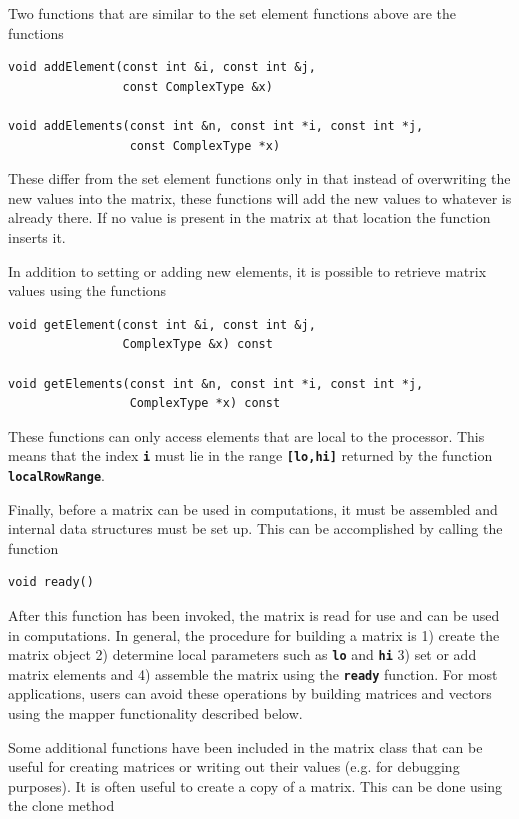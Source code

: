 \documentclass[12pt]{report} %
\begin{document}
Two functions that are similar to the set element functions above are the functions

{
\color{red}
\begin{Verbatim}[fontseries=b]
void addElement(const int &i, const int &j,
                const ComplexType &x)

void addElements(const int &n, const int *i, const int *j,
                 const ComplexType *x)
\end{Verbatim}
}

These differ from the set element functions only in that instead of overwriting the new values into the matrix, these functions will add the new values to whatever is already there. If no value is present in the matrix at that location the function inserts it.

In addition to setting or adding new elements, it is possible to retrieve matrix values using the functions

{
\color{red}
\begin{Verbatim}[fontseries=b]
void getElement(const int &i, const int &j,
                ComplexType &x) const

void getElements(const int &n, const int *i, const int *j,
                 ComplexType *x) const
\end{Verbatim}
}

These functions can only access elements that are local to the processor. This means that the index \texttt{\textbf{i}} must lie in the range \texttt{\textbf{[lo,hi]}} returned by the function \texttt{\textbf{localRowRange}}.

Finally, before a matrix can be used in computations, it must be assembled and internal data structures must be set up. This can be accomplished by calling the function

{
\color{red}
\begin{Verbatim}[fontseries=b]
void ready()
\end{Verbatim}
}

After this function has been invoked, the matrix is read for use and can be used in computations. In general, the procedure for building a matrix is 1) create the matrix object 2) determine local parameters such as \texttt{\textbf{lo}} and \texttt{\textbf{hi}} 3) set or add matrix elements and 4) assemble the matrix using the \texttt{\textbf{ready}} function. For most applications, users can avoid these operations by building matrices and vectors using the mapper functionality described below.

Some additional functions have been included in the matrix class that can be useful for creating matrices or writing out their values (e.g. for debugging purposes). It is often useful to create a copy of a matrix. This can be done using the clone method
\end{document}
